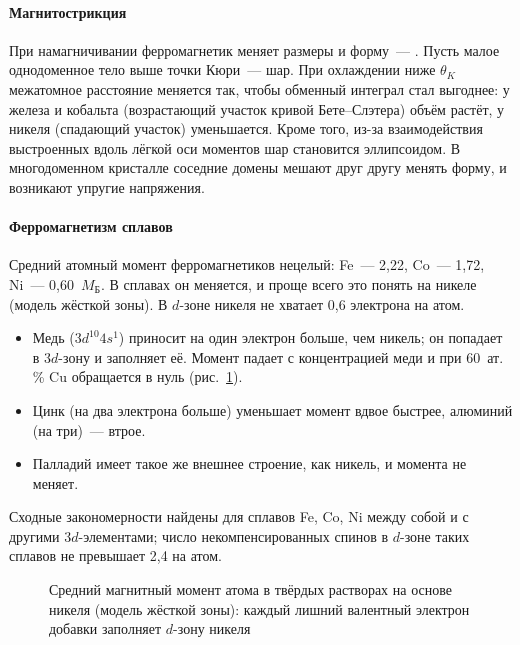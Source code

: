 \paragraph{Магнитострикция}
При намагничивании ферромагнетик меняет размеры и форму~—
. Пусть малое однодоменное тело выше точки Кюри~—
шар. При охлаждении ниже $\theta_K$ межатомное расстояние меняется так,
чтобы обменный интеграл стал выгоднее: у железа и кобальта (возрастающий
участок кривой Бете--Слэтера) объём растёт, у никеля (спадающий участок)
уменьшается. Кроме того, из-за взаимодействия выстроенных вдоль лёгкой
оси моментов шар становится эллипсоидом. В многодоменном кристалле
соседние домены мешают друг другу менять форму, и возникают упругие
напряжения.

\paragraph{Ферромагнетизм сплавов}
Средний атомный момент ферромагнетиков нецелый: Fe~— 2,22, Co~— 1,72,
Ni~— 0,60~$M_\text{Б}$. В сплавах он меняется, и проще всего это понять
на никеле (модель жёсткой зоны). В $d$-зоне никеля не хватает 0,6
электрона на атом.
\begin{itemize}
\item Медь ($3d^{10}4s^1$) приносит на один электрон больше, чем никель; он
попадает в $3d$-зону и заполняет её. Момент падает с концентрацией меди
и при 60~ат.\,\% Cu обращается в нуль (рис.~\ref{fig:slater-ni}).
\item Цинк (на два электрона больше) уменьшает момент вдвое быстрее,
алюминий (на три)~— втрое.
\item Палладий имеет такое же внешнее строение, как никель, и момента не
меняет.
\end{itemize}
Сходные закономерности найдены для сплавов Fe, Co, Ni между собой и с
другими $3d$-элементами; число некомпенсированных спинов в $d$-зоне
таких сплавов не превышает 2,4 на атом.

\begin{figure}[ht]
\centering
{}
\caption{Средний магнитный момент атома в твёрдых растворах на основе
никеля (модель жёсткой зоны): каждый лишний валентный электрон добавки
заполняет $d$-зону никеля}
\label{fig:slater-ni}
\end{figure}

